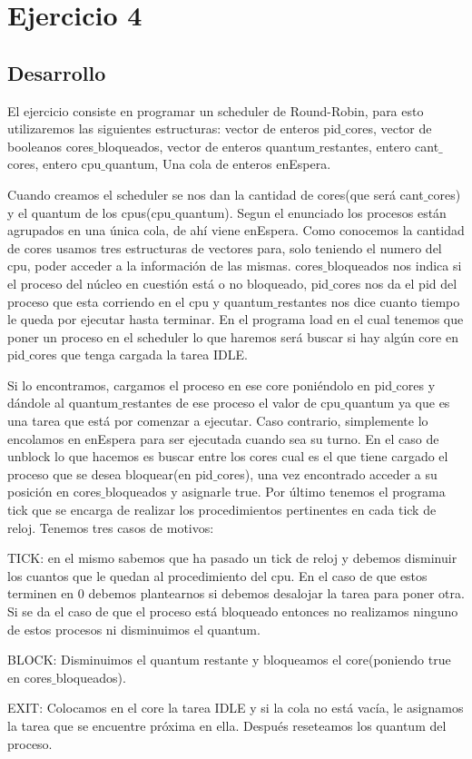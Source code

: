 \section{Ejercicio 4}

\subsection{Desarrollo}
El ejercicio consiste en programar un scheduler de Round-Robin, para esto utilizaremos las siguientes estructuras: vector de enteros pid$\_$cores, vector de booleanos cores$\_$bloqueados, vector de enteros quantum$\_$restantes, entero cant$\_$cores, entero cpu$\_$quantum, Una cola de enteros enEspera.

Cuando creamos el scheduler se nos dan la cantidad de cores(que será cant$\_$cores) y el quantum de los cpus(cpu$\_$quantum). Segun el enunciado los procesos están agrupados en una única cola, de ahí viene enEspera. Como conocemos la cantidad de cores usamos tres estructuras de vectores para, solo teniendo el numero del cpu, poder acceder a la información de las mismas. cores$\_$bloqueados nos indica si el proceso del núcleo en cuestión está o no bloqueado, pid$\_$cores nos da el pid del proceso que esta corriendo en el cpu y quantum$\_$restantes nos dice cuanto tiempo le queda por ejecutar hasta terminar.
En el programa load en el cual tenemos que poner un proceso en el scheduler lo que haremos será buscar si hay algún core en pid$\_$cores que tenga cargada la tarea IDLE.
 
Si lo encontramos, cargamos el proceso en ese core poniéndolo en pid$\_$cores y dándole al quantum$\_$restantes de ese proceso el valor de cpu$\_$quantum ya que es una tarea que está por comenzar a ejecutar. Caso contrario, simplemente lo encolamos en enEspera para ser ejecutada cuando sea su turno.
En el caso de unblock lo que hacemos es buscar entre los cores cual es el que tiene cargado el proceso que se desea bloquear(en pid$\_$cores), una vez encontrado acceder a su posición en cores$\_$bloqueados y asignarle true.
Por último tenemos el programa tick que se encarga de realizar los procedimientos pertinentes en cada tick de reloj. Tenemos tres casos de motivos:
 
TICK: en el mismo sabemos que ha pasado un tick de reloj y debemos disminuir los cuantos que le quedan al procedimiento del cpu. En el caso de que estos terminen en 0 debemos plantearnos si debemos desalojar la tarea para poner otra. Si se da el caso de que el proceso está bloqueado entonces no realizamos ninguno de estos procesos ni disminuimos el quantum.

BLOCK: Disminuimos el quantum restante y bloqueamos el core(poniendo true en cores$\_$bloqueados).

EXIT: Colocamos en el core la tarea IDLE y si la cola no está vacía, le asignamos la tarea que se encuentre próxima en ella. Después reseteamos los quantum del proceso. 

